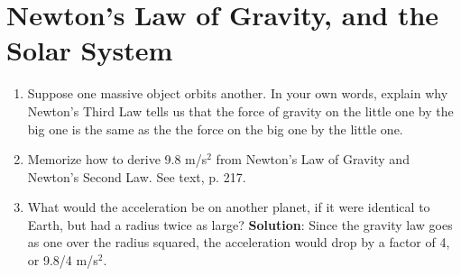 \documentclass[10pt]{article}
\begin{document}
\section{Newton's Law of Gravity, and the Solar System}
\begin{enumerate}
\item Suppose one massive object orbits another.  In your own words, explain why Newton's Third Law tells us that the force of gravity on the little one by the big one is the same as the the force on the big one by the little one.
\item Memorize how to derive 9.8 m/s$^2$ from Newton's Law of Gravity and Newton's Second Law.  See text, p. 217.
\item What would the acceleration be on another planet, if it were identical to Earth, but had a radius twice as large?  \textbf{Solution}: Since the gravity law goes as one over the radius squared, the acceleration would drop by a factor of 4, or 9.8/4 m/s$^2$.
\end{enumerate}
\end{document}
